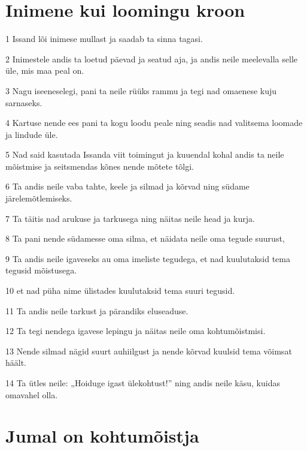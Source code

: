 \section*{Inimene kui loomingu kroon}

\par 1 Issand lõi inimese mullast ja saadab ta sinna tagasi.
\par 2 Inimestele andis ta loetud päevad ja seatud aja, ja andis neile meelevalla selle üle, mis maa peal on.
\par 3 Nagu iseeneselegi, pani ta neile rüüks rammu ja tegi nad omaenese kuju sarnaseks.
\par 4 Kartuse nende ees pani ta kogu loodu peale ning seadis nad valitsema loomade ja lindude üle.
\par 5 Nad said kasutada Issanda viit toimingut ja kuuendal kohal andis ta neile mõistmise ja seitsmendas kõnes nende mõtete tõlgi.
\par 6 Ta andis neile vaba tahte, keele ja silmad ja kõrvad ning südame järelemõtlemiseks.
\par 7 Ta täitis nad arukuse ja tarkusega ning näitas neile head ja kurja.
\par 8 Ta pani nende südamesse oma silma, et näidata neile oma tegude suurust,
\par 9 Ta andis neile igaveseks au oma imeliste tegudega, et nad kuulutaksid tema tegusid mõistusega.
\par 10 et nad püha nime ülistades kuulutaksid tema suuri tegusid.
\par 11 Ta andis neile tarkust ja pärandiks eluseaduse.
\par 12 Ta tegi nendega igavese lepingu ja näitas neile oma kohtumõistmisi.
\par 13 Nende silmad nägid suurt auhiilgust ja nende kõrvad kuulsid tema võimsat häält.
\par 14 Ta ütles neile: „Hoiduge igast ülekohtust!” ning andis neile käsu, kuidas omavahel olla.

\section*{Jumal on kohtumõistja}

